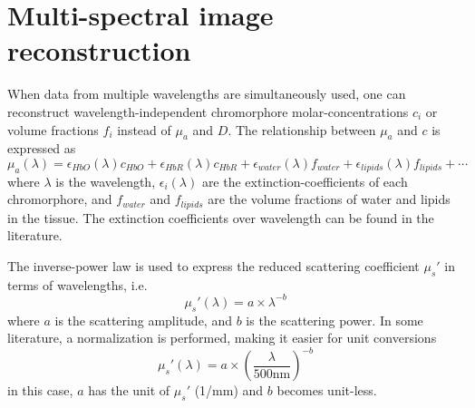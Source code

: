 \documentclass{article}
\begin{document}
\section{Multi-spectral image reconstruction}
When data from multiple wavelengths are simultaneously used, one can reconstruct wavelength-independent chromorphore molar-concentrations $c_i$ or volume fractions $f_i$ instead of $\mu_a$ and $D$. The relationship between $\mu_a$ and $c$ is expressed as
\begin{equation}
\mu_a(\lambda)=\epsilon_{HbO}(\lambda)c_{HbO}+\epsilon_{HbR}(\lambda)c_{HbR}+\epsilon_{water}(\lambda)f_{water}+\epsilon_{lipids}(\lambda)f_{lipids}+ \cdots
\end{equation}
where $\lambda$ is the wavelength, $\epsilon_i(\lambda)$ are the extinction-coefficients of each chromorphore, and $f_{water}$ and $f_{lipids}$ are the volume fractions of water and lipids in the tissue. The extinction coefficients over wavelength can be found in the literature. 

The inverse-power law is used to express the reduced scattering coefficient $\mu_s'$ in terms of wavelengths, i.e.
\begin{equation}
\mu_s'(\lambda)=a\times\lambda^{-b}
\end{equation}
where $a$ is the scattering amplitude, and $b$ is the scattering power. In some literature, a normalization is performed, making it easier for unit conversions
\begin{equation}
\mu_s'(\lambda)=a\times\left(\frac{\lambda}{500 \mathrm{nm}}\right)^{-b}
\end{equation}
in this case, $a$ has the unit of $\mu_s'$ (1/mm) and $b$ becomes unit-less.
\end{document}

